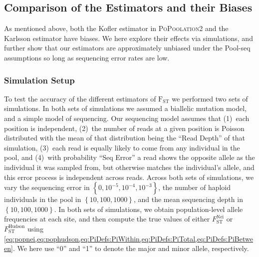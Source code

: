 \documentclass[a4paper,fontsize=9pt,DIV=14]{scrartcl}
\newcommand\toolname{\textsc}
\newcommand{\neifst}{F_\text{ST}^\text{Nei}}
\newcommand{\hudsonfst}{F_\text{ST}^\text{Hudson}}
\begin{document}
\subsection{Comparison of the Estimators and their Biases}
\label{supp:sec:FST:sub:Comparison}

As mentioned above, both the Kofler estimator in \toolname{PoPoolation2} and the Karlsson estimator have biases.
We here explore their effects via simulations, and further show that our estimators are approximately unbiased under the Pool-seq assumptions so long as sequencing error rates are low.


\subsubsection*{Simulation Setup}
\label{supp:sec:FST:sub:Comparison:sub:Simulations}

To test the accuracy of the different estimators of $\text{F}_\text{ST}$ we performed two sets of simulations.  In both sets of simulations we assumed a biallelic mutation model, and a simple model of sequencing.  Our sequencing model assumes that (1)~each position is independent, (2)~the number of reads at a given position is Poisson distributed with the mean of that distribution being the ``Read Depth'' of that simulation, (3)~each read is equally likely to come from any individual in the pool, and (4)~with probability ``Seq Error'' a read shows the opposite allele as the individual it was sampled from, but otherwise matches the individual's allele, and this error process is independent across reads.  Across both sets of simulations, we vary the sequencing error in $\left\{0, 10^{-5}, 10^{-4}, 10^{-3}\right\}$, the number of haploid individuals in the pool in $\left\{10, 100, 1000\right\}$, and the mean sequencing depth in $\left\{10, 100, 1000\right\}$.  In both sets of simulations, we obtain population-level allele frequencies at each site, and then compute the true values of either $\neifst$ or $\hudsonfst$ using \cref{eq:popnei,eq:pophudson,eq:PiDefs:PiWithin,eq:PiDefs:PiTotal,eq:PiDefs:PiBetween}.
We here use ``0'' and ``1'' to denote the major and minor allele, respectively.
\end{document}
